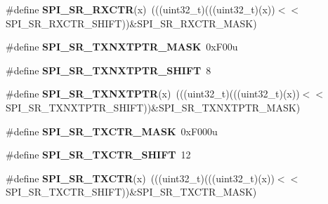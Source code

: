 \begin{DoxyCompactItemize}
\item 
\#define {\bfseries S\+P\+I\+\_\+\+S\+R\+\_\+\+R\+X\+C\+TR}(x)~(((uint32\+\_\+t)(((uint32\+\_\+t)(x))$<$$<$S\+P\+I\+\_\+\+S\+R\+\_\+\+R\+X\+C\+T\+R\+\_\+\+S\+H\+I\+FT))\&S\+P\+I\+\_\+\+S\+R\+\_\+\+R\+X\+C\+T\+R\+\_\+\+M\+A\+SK)\hypertarget{group__SPI__Register__Masks_ga2b05bb18cd3b859747bf5bff6e0eda29}{}\label{group__SPI__Register__Masks_ga2b05bb18cd3b859747bf5bff6e0eda29}

\item 
\#define {\bfseries S\+P\+I\+\_\+\+S\+R\+\_\+\+T\+X\+N\+X\+T\+P\+T\+R\+\_\+\+M\+A\+SK}~0x\+F00u\hypertarget{group__SPI__Register__Masks_ga5526eeae29bb85218c41d8a06608acbd}{}\label{group__SPI__Register__Masks_ga5526eeae29bb85218c41d8a06608acbd}

\item 
\#define {\bfseries S\+P\+I\+\_\+\+S\+R\+\_\+\+T\+X\+N\+X\+T\+P\+T\+R\+\_\+\+S\+H\+I\+FT}~8\hypertarget{group__SPI__Register__Masks_ga129ad514464ae667c6d78ee9840236d5}{}\label{group__SPI__Register__Masks_ga129ad514464ae667c6d78ee9840236d5}

\item 
\#define {\bfseries S\+P\+I\+\_\+\+S\+R\+\_\+\+T\+X\+N\+X\+T\+P\+TR}(x)~(((uint32\+\_\+t)(((uint32\+\_\+t)(x))$<$$<$S\+P\+I\+\_\+\+S\+R\+\_\+\+T\+X\+N\+X\+T\+P\+T\+R\+\_\+\+S\+H\+I\+FT))\&S\+P\+I\+\_\+\+S\+R\+\_\+\+T\+X\+N\+X\+T\+P\+T\+R\+\_\+\+M\+A\+SK)\hypertarget{group__SPI__Register__Masks_gabc6d25e4bdcb3abacedb397ad24b0bc3}{}\label{group__SPI__Register__Masks_gabc6d25e4bdcb3abacedb397ad24b0bc3}

\item 
\#define {\bfseries S\+P\+I\+\_\+\+S\+R\+\_\+\+T\+X\+C\+T\+R\+\_\+\+M\+A\+SK}~0x\+F000u\hypertarget{group__SPI__Register__Masks_gaba58e43f829f6e6103933bf570e9feb7}{}\label{group__SPI__Register__Masks_gaba58e43f829f6e6103933bf570e9feb7}

\item 
\#define {\bfseries S\+P\+I\+\_\+\+S\+R\+\_\+\+T\+X\+C\+T\+R\+\_\+\+S\+H\+I\+FT}~12\hypertarget{group__SPI__Register__Masks_gad7fc9ecdd51f12aabb492271648e133b}{}\label{group__SPI__Register__Masks_gad7fc9ecdd51f12aabb492271648e133b}

\item 
\#define {\bfseries S\+P\+I\+\_\+\+S\+R\+\_\+\+T\+X\+C\+TR}(x)~(((uint32\+\_\+t)(((uint32\+\_\+t)(x))$<$$<$S\+P\+I\+\_\+\+S\+R\+\_\+\+T\+X\+C\+T\+R\+\_\+\+S\+H\+I\+FT))\&S\+P\+I\+\_\+\+S\+R\+\_\+\+T\+X\+C\+T\+R\+\_\+\+M\+A\+SK)\hypertarget{group__SPI__Register__Masks_gad5bd8906225c5b7e8ed97cacd8a0d3bd}{}\label{group__SPI__Register__Masks_gad5bd8906225c5b7e8ed97cacd8a0d3bd}


\end{DoxyCompactItemize}
